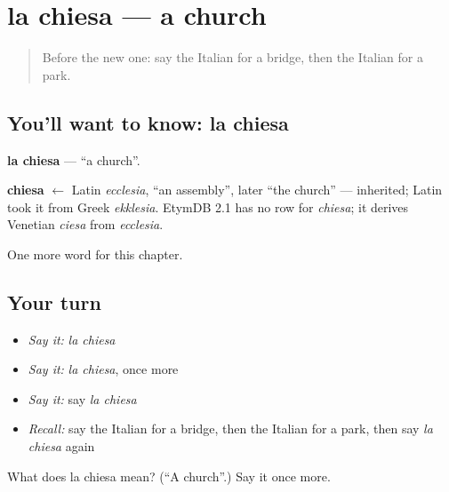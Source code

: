 \section[la chiesa]{la chiesa — a church}

\label{lesson:IT-C83-chiesa}



\begin{quote}
Before the new one: say the Italian for a bridge, then the Italian for a park.
\end{quote}

\subsection*{You'll want to know: la chiesa}
\textbf{la chiesa} — \textquotedblleft{}a church\textquotedblright{}.

\begin{cousinweb}
\textbf{chiesa} $\leftarrow$ Latin \emph{ecclesia}, \textquotedblleft{}an assembly\textquotedblright{}, later \textquotedblleft{}the church\textquotedblright{} — inherited; Latin took it from Greek \emph{ekklesia}. EtymDB 2.1 has no row for \emph{chiesa}; it derives Venetian \emph{ciesa} from \emph{ecclesia}.
\end{cousinweb}

\begin{grammarlens}[title={What you've built}]
One more word for this chapter.
\end{grammarlens}

\subsection*{Your turn}
\begin{itemize}
\raggedright
  \item \emph{Say it:} \emph{la chiesa}
  \item \emph{Say it:} \emph{la chiesa}, once more
  \item \emph{Say it:} say \emph{la chiesa}
  \item \emph{Recall:} say the Italian for a bridge, then the Italian for a park, then say \emph{la chiesa} again
\end{itemize}

\begin{tcolorbox}[breakable,colback=teal!4,colframe=teal!35!black,title={Before you move on}]
What does la chiesa mean? (\textquotedblleft{}A church\textquotedblright{}.) Say it once more.
\end{tcolorbox}
